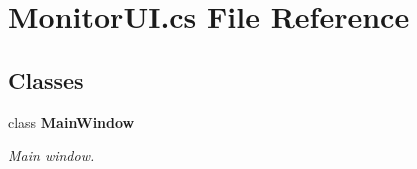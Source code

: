 \section{Monitor\+U\+I.\+cs File Reference}
\label{_monitor_u_i_8cs}
\subsection*{Classes}
\begin{DoxyCompactItemize}
\item 
class \textbf{ Main\+Window}
\begin{DoxyCompactList}\small\item\em Main window. \end{DoxyCompactList}\end{DoxyCompactItemize}
